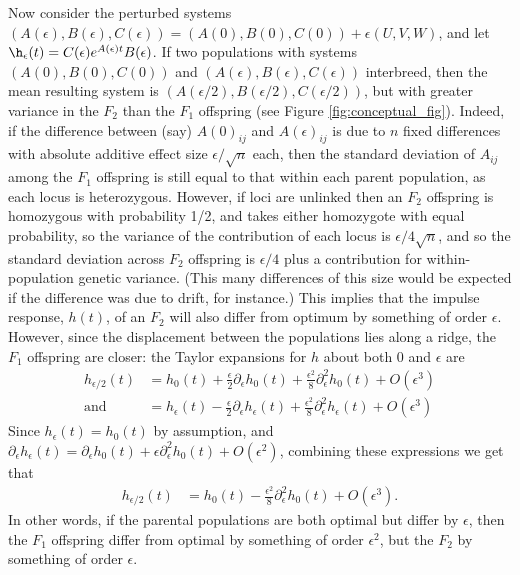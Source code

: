 \documentclass{article}
\newcommand{\1}{\mathbbm{1}}
\begin{document}
Now consider the perturbed systems $(A(\epsilon), B(\epsilon), C(\epsilon)) = (A(0), B(0), C(0)) + \epsilon (U, V, W)$,
and let $\h_\epsilon(t) = C(\epsilon) e^{A(\epsilon) t} B(\epsilon)$.
If two populations with systems $(A(0), B(0), C(0))$ and $(A(\epsilon), B(\epsilon), C(\epsilon))$ interbreed,
then the mean resulting system is $(A({\epsilon/2}), B({\epsilon/2}), C({\epsilon/2}))$,
but with greater variance in the $F_2$ than the $F_1$ offspring (see Figure \ref{fig:conceptual_fig}).
Indeed, if the difference between (say) $A(0)_{ij}$ and $A(\epsilon)_{ij}$
is due to $n$ fixed differences with absolute additive effect size $\epsilon/\sqrt{n}$ each,
then the standard deviation of $A_{ij}$ among the $F_1$ offspring is still equal to that
within each parent population, as each locus is heterozygous.
However, if loci are unlinked then an $F_2$ offspring is homozygous with probability 1/2,
and takes either homozygote with equal probability,
so the variance of the contribution of each locus is $\epsilon/4\sqrt{n}$,
and so the standard deviation across $F_2$ offspring is $\epsilon/4$
plus a contribution for within-population genetic variance.
(This many differences of this size would be expected if the difference was due to drift, for instance.)
This implies that the impulse response, $h(t)$, of an $F_2$ will also differ from optimum
by something of order $\epsilon$.
However, since the displacement between the populations lies along a ridge,
the $F_1$ offspring are closer:
the Taylor expansions for $h$ about both 0 and $\epsilon$ are
\begin{align}
    h_{\epsilon/2}(t)
    &= h_0(t)
        + \frac{\epsilon}{2} \partial_\epsilon h_0(t)
        + \frac{\epsilon^2}{8} \partial_\epsilon^2 h_0(t)
        + O(\epsilon^3) \\
    \text{and} \quad
    &= h_\epsilon(t)
        - \frac{\epsilon}{2} \partial_\epsilon h_\epsilon(t)
        + \frac{\epsilon^2}{8} \partial_\epsilon^2 h_\epsilon(t)
        + O(\epsilon^3)
\end{align}
Since $h_\epsilon(t) = h_0(t)$ by assumption,
and $\partial_\epsilon h_\epsilon(t) = \partial_\epsilon h_0(t) + \epsilon \partial_\epsilon^2 h_0(t) + O(\epsilon^2)$,
combining these expressions we get that
\begin{align}
    h_{\epsilon/2}(t)
    &= h_0(t)
        - \frac{\epsilon^2}{8} \partial_\epsilon^2 h_0(t)
        + O(\epsilon^3) .
\end{align}
In other words, if the parental populations are both optimal but differ by $\epsilon$,
then the $F_1$ offspring differ from optimal by something of order $\epsilon^2$,
but the $F_2$ by something of order $\epsilon$.
\end{document}
